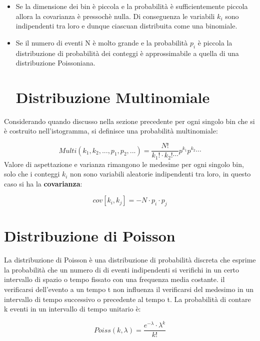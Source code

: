 \documentclass[11pt,a4paper]{book}
\begin{document}
\begin{itemize}
\item
\noindent Se la dimensione dei bin \`{e} piccola e la probabilit\`{a} \`{e} sufficientemente piccola allora la covarianza \`{e} pressoch\`{e} nulla. Di conseguenza le variabili $k_i$ sono indipendenti tra loro e dunque ciascuan distribuita come una binomiale.
\item
\noindent Se il numero di eventi N \`{e} molto grande e la probabilit\`{a} $p_i$ \`{e} piccola la distribuzione di probabilit\`{a} dei conteggi \`{e} approssimabile a quella di una distribuzione Poissoniana. 
\section{Distribuzione Multinomiale}

\end{itemize}

Considerando quando discusso nella sezione precedente per ogni singolo bin che si \`{e} costruito nell'istogramma, si definisce una probabilit\`{a} multinomiale:

\begin{equation}
	Multi(k_1,k_2,...,p_1,p_2,...) = \dfrac{N!}{k_1!\cdot k_2! \cdots}p^{k_{1}}p^{k_2}\cdots
\end{equation}
\newline
\noindent Valore di aspettazione e varianza rimangono le medesime per ogni singolo bin, solo che i conteggi $k_i$ non sono variabili aleatorie indipendenti tra loro, in questo caso si ha la \textbf{covarianza}:

\begin{equation}
	cov[k_i,k_j] = -N \cdot p_i \cdot p_j 
\end{equation}

\section{Distribuzione di Poisson}

La distribuzione di Poisson \`{e} una distribuzione di probabilit\`{a} discreta che esprime la probabilit\`{a} che un numero di di eventi indipendenti si verifichi in un certo intervallo di spazio o tempo fissato con una frequenza media costante. il verificarsi dell'evento a un tempo t non influenza il verificarsi del medesimo in un intervallo di tempo successivo o precedente  al tempo t.
La probabilit\`{a} di contare k eventi in un intervallo di tempo unitario \`{e}:

\begin{equation}
	Poiss(k,\lambda) = \dfrac{e^{-\lambda} \cdot \lambda^k}{k!}
\end{equation}
\end{document}
